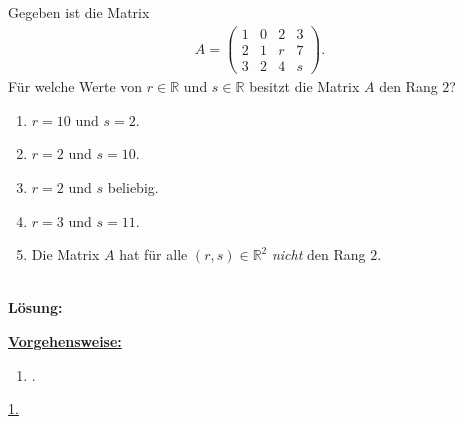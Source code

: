 \subsection*{}
Gegeben ist die Matrix
\begin{align*}
	A =
	\begin{pmatrix}
		1 & 0 & 2 & 3 \\
		2 & 1 & r & 7 \\
		3 & 2 & 4 &  s 
	\end{pmatrix}.
\end{align*}
Für welche Werte von $ r \in \mathbb{R} $ und $ s \in \mathbb{R} $ besitzt die Matrix $ A $ den Rang $ 2 $?
\renewcommand{\labelenumi}{(\alph{enumi})}
\begin{enumerate}
	\item 
	$ r = 10 $ und $ s = 2 $.
	\item 
	$ r =  2 $ und $ s = 10 $.
	\item
	$ r = 2 $ und $ s $ beliebig.
	\item
	$ r = 3 $ und $ s = 11 $.
	\item
	Die Matrix $ A $ hat für alle $ (r,s) \in \mathbb{R}^2 $ \textit{nicht} den Rang $ 2 $.
\end{enumerate}
\ \\
\textbf{Lösung:}
\begin{mdframed}
\underline{\textbf{Vorgehensweise:}}
\renewcommand{\labelenumi}{\theenumi.}
\begin{enumerate}
\item .
\end{enumerate}
\end{mdframed}

\underline{1. }\\
\newpage

